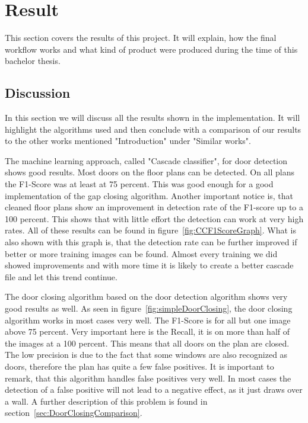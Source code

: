 \section{Result}
This section covers the results of this project. It will explain, how the final workflow works and what kind of product were produced during the time of this bachelor thesis.

\subsection{Discussion}
\label{sub:Discussion}
In this section we will discuss all the results shown in the implementation. It will highlight the algorithms used and then conclude with a comparison of our results to the other works mentioned "Introduction" under "Similar works".

The machine learning approach, called "Cascade classifier", for door detection shows good results. Most doors on the floor plans can be detected. On all plans the F1-Score was at least at 75 percent. This was good enough for a good implementation of the gap closing algorithm. Another important notice is, that cleaned floor plans show an improvement in detection rate of the F1-score up to a 100 percent. This shows that with little effort the detection can work at very high rates. All of these results can be found in figure~\ref{fig:CCF1ScoreGraph}. What is also shown with this graph is, that the detection rate can be further improved if better or more training images can be found. Almost every training we did showed improvements and with more time it is likely to create a better cascade file and let this trend continue.

The door closing algorithm based on the door detection algorithm shows very good results as well. As seen in figure~\ref{fig:simpleDoorClosing}, the door closing algorithm works in most cases very well. The F1-Score is for all but one image above 75 percent. Very important here is the Recall, it is on more than half of the images at a 100 percent. This means that all doors on the plan are closed. The low precision is due to the fact that some windows are also recognized as doors, therefore the plan has quite a few false positives. It is important to remark, that this algorithm handles false positives very well. In most cases the detection of a false positive will not lead to a negative effect, as it just draws over a wall. A further description of this problem is found in section~\ref{sec:DoorClosingComparison}.

